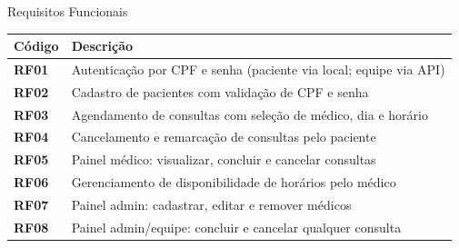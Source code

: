 \documentclass[xcolor={table}]{beamer}
\begin{document}
\begin{frame}{Requisitos Funcionais}
    \small
    \begin{table}
        \begin{tabular}{>{\bfseries}p{1.1cm} p{8.2cm}}
            \toprule
            \textbf{Código} & \textbf{Descrição} \\
            \midrule
            RF01 & Autenticação por CPF e senha (paciente via local; equipe via API) \\
            RF02 & Cadastro de pacientes com validação de CPF e senha \\
            RF03 & Agendamento de consultas com seleção de médico, dia e horário \\
            RF04 & Cancelamento e remarcação de consultas pelo paciente \\
            RF05 & Painel médico: visualizar, concluir e cancelar consultas \\
            RF06 & Gerenciamento de disponibilidade de horários pelo médico \\
            RF07 & Painel admin: cadastrar, editar e remover médicos \\
            RF08 & Painel admin/equipe: concluir e cancelar qualquer consulta \\
            \bottomrule
        \end{tabular}
    \end{table}
\end{frame}
\end{document}
